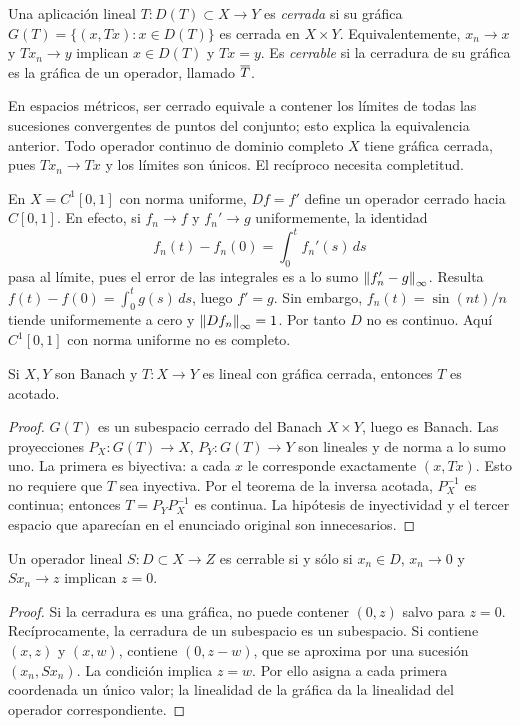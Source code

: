 \begin{definicion}
Una aplicación lineal $T:D(T)\subset X\to Y$ es \emph{cerrada} si su gráfica $G(T)=\{(x,Tx):x\in D(T)\}$ es cerrada en $X\times Y$. Equivalentemente, $x_n\to x$ y $Tx_n\to y$ implican $x\in D(T)$ y $Tx=y$. Es \emph{cerrable} si la cerradura de su gráfica es la gráfica de un operador, llamado $\overline{T}$.
\end{definicion}
En espacios métricos, ser cerrado equivale a contener los límites de todas las sucesiones convergentes de puntos del conjunto; esto explica la equivalencia anterior. Todo operador continuo de dominio completo $X$ tiene gráfica cerrada, pues $Tx_n\to Tx$ y los límites son únicos. El recíproco necesita completitud.

\begin{ejemplo}
En $X=C^1[0,1]$ con norma uniforme, $Df=f'$ define un operador cerrado hacia $C[0,1]$. En efecto, si $f_n\to f$ y $f_n'\to g$ uniformemente, la identidad
\[f_n(t)-f_n(0)=\int_0^t f_n'(s)\,ds\]
pasa al límite, pues el error de las integrales es a lo sumo $\left\lVert f_n'-g\right\rVert_\infty$. Resulta $f(t)-f(0)=\int_0^t g(s)\,ds$, luego $f'=g$. Sin embargo, $f_n(t)=\sin(nt)/n$ tiende uniformemente a cero y $\left\lVert Df_n\right\rVert_\infty=1$. Por tanto $D$ no es continuo. Aquí $C^1[0,1]$ con norma uniforme no es completo.
\end{ejemplo}

\begin{teorema}\label{v3:grafica-cerrada}
Si $X,Y$ son Banach y $T:X\to Y$ es lineal con gráfica cerrada, entonces $T$ es acotado.
\end{teorema}
\begin{proof}
$G(T)$ es un subespacio cerrado del Banach $X\times Y$, luego es Banach. Las proyecciones $P_X:G(T)\to X$, $P_Y:G(T)\to Y$ son lineales y de norma a lo sumo uno. La primera es biyectiva: a cada $x$ le corresponde exactamente $(x,Tx)$. Esto no requiere que $T$ sea inyectiva. Por el teorema de la inversa acotada, $P_X^{-1}$ es continua; entonces $T=P_YP_X^{-1}$ es continua. La hipótesis de inyectividad y el tercer espacio que aparecían en el enunciado original son innecesarios.
\end{proof}

\begin{proposicion}\label{v3:cerrabilidad}
Un operador lineal $S:D\subset X\to Z$ es cerrable si y sólo si $x_n\in D$, $x_n\to0$ y $Sx_n\to z$ implican $z=0$.
\end{proposicion}
\begin{proof}
Si la cerradura es una gráfica, no puede contener $(0,z)$ salvo para $z=0$. Recíprocamente, la cerradura de un subespacio es un subespacio. Si contiene $(x,z)$ y $(x,w)$, contiene $(0,z-w)$, que se aproxima por una sucesión $(x_n,Sx_n)$. La condición implica $z=w$. Por ello asigna a cada primera coordenada un único valor; la linealidad de la gráfica da la linealidad del operador correspondiente.
\end{proof}

